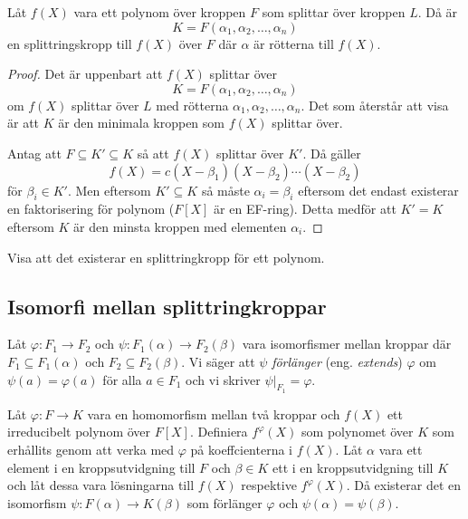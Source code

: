 \documentclass{article}
\theoremstyle{definition}
\begin{document}
\hypertarget{lemma6.0.1}{}
\begin{mylemma}{}{}
  Låt $f(X)$ vara ett polynom över kroppen $F$ som splittar över kroppen $L$. Då är 
  \[K = F(\alpha_1, \alpha_2, \ldots, \alpha_n)\]
  en splittringskropp till $f(X)$ över $F$ där $\alpha$ är rötterna till $f(X)$.
\end{mylemma}

\begin{proof}
  Det är uppenbart att $f(X)$ splittar över 
  \[K = F(\alpha_1, \alpha_2, \ldots, \alpha_n)\]
  om $f(X)$ splittar över $L$ med rötterna $\alpha_1, \alpha_2, \ldots, \alpha_n$. Det som återstår att visa är att 
  $K$ är den minimala kroppen som $f(X)$ splittar över. 

  Antag att $F \subseteq K' \subseteq K$ så att $f(X)$ splittar över $K'$. Då gäller 
  \[f(X) = c(X- \beta_1)(X - \beta_2)\cdots (X - \beta_2)\]
  för $\beta_i \in K'.$ 
  Men eftersom $K' \subseteq K$ så måste $\alpha_i = \beta_i$ eftersom det endast existerar en faktorisering för polynom ($F[X]$ är en EF-ring). 
  Detta medför att $K' = K$ eftersom $K$ är den minsta kroppen med elementen $\alpha_i$.
\end{proof}

\begin{ovning}{6}
  Visa att det existerar en splittringkropp för ett polynom.
\end{ovning}

\subsection{Isomorfi mellan splittringkroppar}
\begin{mydef}{}{}
  Låt $\varphi: F_1 \rightarrow F_2$ och $\psi: F_1(\alpha) \rightarrow F_2(\beta)$ vara isomorfismer mellan kroppar där $F_1 \subseteq F_1(\alpha)$
  och $F_2 \subseteq F_2(\beta)$. 
  Vi säger att $\psi$ \textit{förlänger} (eng. \textit{extends})
  $\varphi$ om $\psi(a) = \varphi(a)$ för alla $a \in F_1$ och vi skriver $\psi |_{F_1} = \varphi.$
\end{mydef}

\hypertarget{6.0.2}{}
\begin{mylemma}{}{}
  Låt $\varphi: F \rightarrow K$ vara en homomorfism mellan två kroppar och $f(X)$ ett irreducibelt polynom över $F[X]$. Definiera $f^{\varphi}(X)$
  som polynomet över $K$ som erhållits genom att verka med $\varphi$ på koeffcienterna i $f(X)$. Låt $\alpha$ vara ett element i en kroppsutvidgning till $F$
  och $\beta \in K$ ett i en kroppsutvidgning till $K$ och låt dessa vara lösningarna till
  $f(X)$ respektive $f^{\varphi}(X)$. Då existerar det en isomorfism $\psi:F(\alpha) \rightarrow K(\beta)$ 
  som förlänger $\varphi$ och $\psi(\alpha) = \psi(\beta).$
\end{mylemma}
\end{document}
